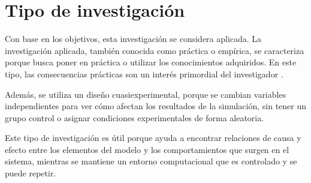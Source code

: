 \section{Tipo de investigación}

Con base en los objetivos, esta investigación se considera aplicada. La investigación aplicada, también conocida como práctica o empírica, se caracteriza porque busca poner en práctica o utilizar los conocimientos adquiridos. En este tipo, las consecuencias prácticas son un interés primordial del investigador \cite{aplicada}.

Además, se utiliza un diseño cuasiexperimental, porque se cambian variables independientes para ver cómo afectan los resultados de la simulación, sin tener un grupo control o asignar condiciones experimentales de forma aleatoria. 

Este tipo de investigación es útil porque ayuda a encontrar relaciones de causa y efecto entre los elementos del modelo y los comportamientos que surgen en el sistema, mientras se mantiene un entorno computacional que es controlado y se puede repetir.
